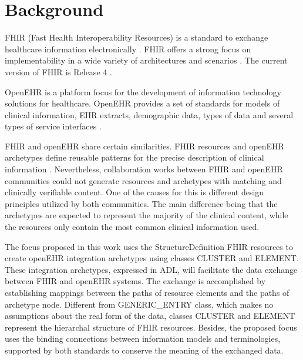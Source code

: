 \section{Background}

FHIR (Fast Health Interoperability Resources) is a standard to exchange healthcare information electronically  \cite{FHIRClinician}. FHIR offers a strong focus on  implementability in a wide variety of architectures and scenarios \cite{FHIRExecutive}. The current version of FHIR is Release 4 \cite{FHIR}.

OpenEHR is a platform focus for the development of information technology solutions for healthcare. OpenEHR provides a set of standards for models of clinical information, EHR extracts, demographic data, types of data and several types of service interfaces \cite{openEHRWhitePaper}.







FHIR and openEHR share certain similarities. FHIR resources and openEHR archetypes define reusable patterns for the precise description of clinical information \cite{Bosca15}. Nevertheless, collaboration works between FHIR and openEHR communities \cite{Collaboration} could not generate resources and archetypes with matching and clinically verifiable content. One of the causes for this is different design principles utilized by both communities. The main difference being that the archetypes are expected to represent the majority of the clinical content, while the resources only contain the most common clinical information used.

The focus proposed in this work uses the StructureDefinition FHIR resources to create openEHR integration archetypes using classes CLUSTER and ELEMENT. These integration archetypes, expressed in ADL, will facilitate the data exchange between FHIR and openEHR systems. The exchange is accomplished by establishing mappings between the paths of resource elements and the paths of archetype node. Different from GENERIC\_ENTRY class, which makes no assumptions about the real form of the data, classes CLUSTER and ELEMENT represent the hierarchal structure of FHIR resources. Besides, the proposed focus uses the binding connections between information models and terminologies, supported by both standards to conserve the meaning of the exchanged data.
